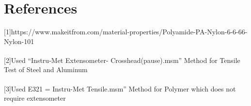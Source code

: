 \documentclass{article}
\begin{document}
\section{References}
\paragraph{}
[1]https://www.makeitfrom.com/material-properties/Polyamide-PA-Nylon-6-6-66-Nylon-101
\paragraph{}
[2]Used “Instru-Met Extensometer- Crosshead(pause).msm” Method for Tensile Test of Steel and Aluminum
\paragraph{}
[3]Used E321 = Instru-Met Tensile.msm” Method for Polymer which does not require extensometer
\end{document}

